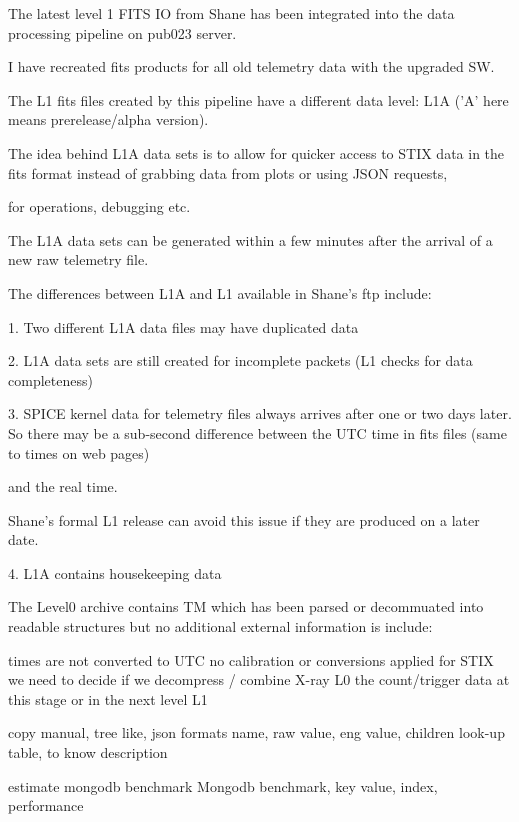 \documentclass{aa}
\begin{document}
The latest level 1 FITS IO from Shane has been integrated into the data processing pipeline on pub023 server.

I have recreated fits products for all old telemetry data with the upgraded SW.

The L1 fits files  created by this pipeline have a different data level:  L1A ('A' here means  prerelease/alpha version).

The idea behind L1A data sets is to allow for quicker access to STIX data in the fits format instead of grabbing  data from plots or using JSON requests,

for operations,  debugging  etc.

The L1A data sets can be generated within a few minutes after the arrival of a new raw telemetry file.

The differences between L1A and L1 available in Shane's ftp include:

1.  Two different L1A data files may have duplicated data

2.  L1A data sets are still created for incomplete packets  (L1 checks for data completeness)

3.  SPICE kernel data for telemetry files always arrives  after one or two days later.
    So  there may be a sub-second difference between the UTC time in fits files (same to times on web pages)

   and the real time.

    Shane's formal L1 release can avoid this issue if they are produced on a later date.

4. L1A contains housekeeping data




The Level0 archive contains TM which has been parsed or decommuated into readable structures but no additional external information is include:

times are not converted to UTC
no calibration or conversions applied
for STIX we need to decide if we decompress / combine X-ray L0 the count/trigger data at this stage or in the next level L1

copy manual,
tree like, 
json formats
name, raw value, eng value, children
look-up table, to know description

estimate mongodb benchmark
Mongodb benchmark,
key value, index, performance
\end{document}

